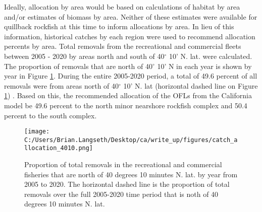\documentclass[11pt,
  english,
  a4paper,
]{article}
\begin{document}
Ideally, allocation by area would be based on calculations of habitat by area and/or estimates of biomass by area. Neither of these estimates were available for quillback rockfish at this time to inform allocations by area. In lieu of this information, historical catches by each region were used to recommend allocation percents by area. Total removals from the recreational and commercial fleets between 2005 - 2020 by areas north and south of 40{\(^\circ\)\leavevmode\tagmcend\tagstructend} 10' N. lat. were calculated. The proportion of removals that are north of 40{\(^\circ\)\leavevmode\tagmcend\tagstructend} 10' N in each year is shown by year in Figure \ref{fig:catch-4010}. During the entire 2005-2020 period, a total of 49.6 percent of all removals were from areas north of 40{\(^\circ\)\leavevmode\tagmcend\tagstructend} 10' N. lat (horizontal dashed line on Figure \ref{fig:catch-4010}) . Based on this, the recommended allocation of the OFLs from the California model be 49.6 percent to the north minor nearshore rockfish complex and 50.4 percent to the south complex.

\leavevmode\tagmcend\tagstructend\par


\begin{figure}
\centering
\texttt{[image: C:/Users/Brian.Langseth/Desktop/ca/write\_up/figures/catch\_allocation\_4010.png]}
\caption{Proportion of total removals in the recreational and commercial fisheries that are north of 40 degrees 10 minutes N. lat. by year from 2005 to 2020. The horizontal dashed line is the proportion of total removals over the full 2005-2020 time period that is noth of 40 degrees 10 minutes N. lat.\label{fig:catch-4010}}
\end{figure}

\tagmcend\tagstructend

\clearpage

\end{document}
